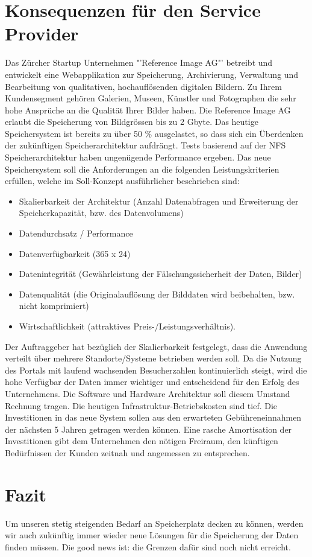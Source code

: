 \section{Konsequenzen für den Service Provider}
Das Zürcher Startup Unternehmen "'Reference Image AG"' betreibt und entwickelt eine Webapplikation zur Speicherung, Archivierung, Verwaltung und Bearbeitung von qualitativen, hochauflösenden digitalen Bildern. Zu Ihrem Kundensegment gehören Galerien, Museen, Künstler und Fotographen die sehr hohe Ansprüche an die Qualität Ihrer Bilder haben. Die Reference Image AG erlaubt die Speicherung von Bildgrössen bis zu 2 Gbyte. Das heutige Speichersystem ist bereits zu über 50 \% ausgelastet, so dass sich ein Überdenken der zukünftigen Speicherarchitektur aufdrängt. Tests basierend auf der NFS Speicherarchitektur haben ungenügende Performance ergeben. Das neue Speichersystem soll die Anforderungen an die folgenden Leistungskriterien erfüllen, welche im Soll-Konzept ausführlicher beschrieben sind: 

\begin{itemize}
\item Skalierbarkeit der Architektur (Anzahl Datenabfragen und Erweiterung der Speicherkapazität, bzw. des Datenvolumens)
\item Datendurchsatz / Performance
\item Datenverfügbarkeit (365 x 24)
\item Datenintegrität (Gewährleistung der Fälschungssicherheit der Daten, Bilder) 
\item Datenqualität (die Originalauflösung der Bilddaten wird beibehalten, bzw. nicht komprimiert) 
\item Wirtschaftlichkeit (attraktives Preis-/Leistungsverhältnis). 
\end{itemize}

Der Auftraggeber hat bezüglich der Skalierbarkeit festgelegt, dass die Anwendung verteilt über mehrere Standorte/Systeme betrieben werden soll. Da die Nutzung des Portals mit laufend wachsenden Besucherzahlen kontinuierlich steigt, wird die hohe Verfügbar der Daten immer wichtiger und entscheidend für den Erfolg des Unternehmens. Die Software und Hardware Architektur soll diesem Umstand Rechnung tragen. Die heutigen Infrastruktur-Betriebskosten sind tief. Die Investitionen in das neue System sollen aus den erwarteten Gebühreneinnahmen der nächsten 5 Jahren getragen werden können. Eine rasche Amortisation der Investitionen gibt dem Unternehmen den nötigen Freiraum, den künftigen Bedürfnissen der Kunden zeitnah und angemessen zu entsprechen. 

\section{Fazit}
Um unseren stetig steigenden Bedarf an Speicherplatz decken zu können, werden wir auch zukünftig immer wieder neue Lösungen für die Speicherung der Daten finden müssen. Die good news ist: die Grenzen dafür sind noch nicht erreicht.

